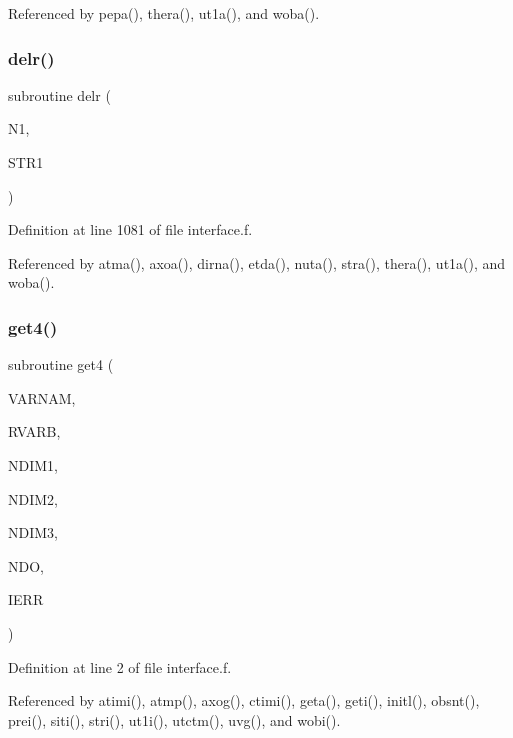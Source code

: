 Referenced by pepa(), thera(), ut1a(), and woba().

\mbox{\label{interface_8f_ace365bef8f59e3de4efaea6303e5a50f}} 
\subsubsection{\texorpdfstring{delr()}{delr()}}
{\footnotesize\ttfamily subroutine delr (\begin{DoxyParamCaption}\item[{integer$\ast$2}]{N1,  }\item[{character$\ast$14}]{S\+T\+R1 }\end{DoxyParamCaption})}



Definition at line 1081 of file interface.\+f.



Referenced by atma(), axoa(), dirna(), etda(), nuta(), stra(), thera(), ut1a(), and woba().

\mbox{\label{interface_8f_ac8790f309ea371d3baf8c028d6b49e5b}} 
\subsubsection{\texorpdfstring{get4()}{get4()}}
{\footnotesize\ttfamily subroutine get4 (\begin{DoxyParamCaption}\item[{character$\ast$14}]{V\+A\+R\+N\+AM,  }\item[{real$\ast$8, dimension(ndim1,ndim2,ndim3)}]{R\+V\+A\+RB,  }\item[{integer$\ast$2}]{N\+D\+I\+M1,  }\item[{integer$\ast$2}]{N\+D\+I\+M2,  }\item[{integer$\ast$2}]{N\+D\+I\+M3,  }\item[{integer$\ast$2}]{N\+DO,  }\item[{integer$\ast$2}]{I\+E\+RR }\end{DoxyParamCaption})}



Definition at line 2 of file interface.\+f.



Referenced by atimi(), atmp(), axog(), ctimi(), geta(), geti(), initl(), obsnt(), prei(), siti(), stri(), ut1i(), utctm(), uvg(), and wobi().


